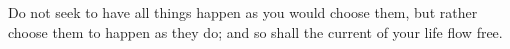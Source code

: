 Do not  seek to have  all things  happen as you  would choose them,  but rather
choose them to  happen as they do; and  so shall the current of  your life flow
free.
